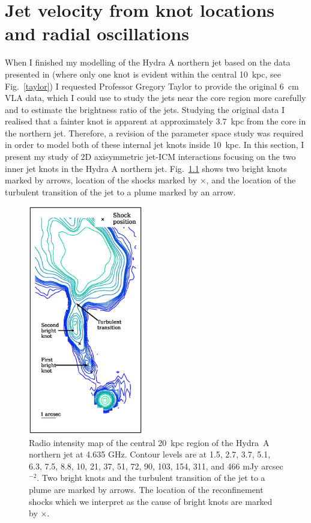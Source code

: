 \chapter{Jet velocity from knot locations and radial oscillations}\label{chapter5}


When I finished my modelling of the Hydra A northern jet based on the data presented in \citet{taylor90} (where only one knot is evident within the central 10~kpc, see Fig.~\ref{taylor}) I requested Professor Gregory Taylor to provide the original 6~cm VLA data, which I could use to study the jets near the core region more carefully and to estimate the brightness ratio of the jets. Studying the original data I realised that a fainter knot is apparent at approximately 3.7~kpc from the core in the northern jet. Therefore, a revision of the parameter space study was required in order to model both of these internal jet knots inside 10~kpc. In this section, I present my study of 2D axisymmetric jet-ICM interactions focusing on the two inner jet knots in the Hydra A northern jet. Fig.~\ref{northern} shows two bright knots marked by arrows, location of the shocks marked by $\times$, and the location of the turbulent transition of the jet to a plume marked by an arrow. 
\begin{figure}
\centering
\includegraphics[width=5cm]{norhtern.eps}
\caption{Radio intensity map of the central 20~kpc region of the Hydra~A northern jet at 4.635 GHz. Contour levels are at 1.5, 2.7, 3.7, 5.1, 6.3, 7.5, 8.8, 10, 21, 37, 51, 72, 90, 103, 154, 311, and 466 mJy arcsec$^{-2}$. Two bright knots and the turbulent transition of the jet to a plume are marked by arrows. The location of the reconfinement shocks which we interpret as the cause of bright knots are marked by $\times$. }
\label{northern}
\end{figure}
